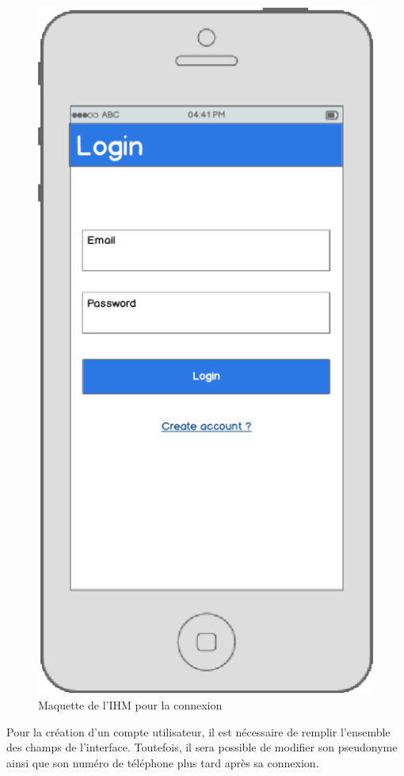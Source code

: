 \documentclass[titlepage, 12pt]{report}
\begin{document}
\begin{figure}[!h]
	\caption{Maquette de l'IHM pour la connexion}
	\label{login}
	\centering
	\includegraphics[scale=0.2]{images/mockups/login.png}
\end{figure}

\clearpage

\par Pour la création d'un compte utilisateur, il est nécessaire de remplir l'ensemble des champs de l'interface. Toutefois, il sera possible de modifier son pseudonyme ainsi que son numéro de téléphone plus tard après sa connexion.
\end{document}
